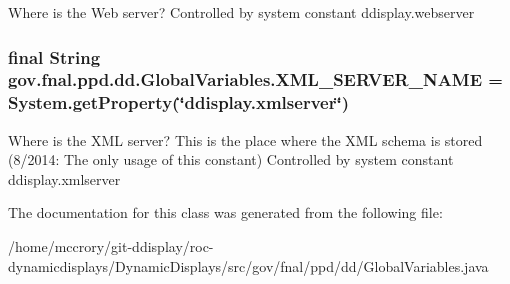 Where is the Web server? Controlled by system constant ddisplay.\-webserver \hypertarget{classgov_1_1fnal_1_1ppd_1_1dd_1_1GlobalVariables_a1b1eb1c9096380d09b968cd474e8bb86}{
\subsubsection[{X\-M\-L\-\_\-\-S\-E\-R\-V\-E\-R\-\_\-\-N\-A\-M\-E}]{\setlength{\rightskip}{0pt plus 5cm}final String gov.\-fnal.\-ppd.\-dd.\-Global\-Variables.\-X\-M\-L\-\_\-\-S\-E\-R\-V\-E\-R\-\_\-\-N\-A\-M\-E = System.\-get\-Property(\char`\"{}ddisplay.\-xmlserver\char`\"{})\hspace{0.3cm}{\ttfamily [static]}}}\label{classgov_1_1fnal_1_1ppd_1_1dd_1_1GlobalVariables_a1b1eb1c9096380d09b968cd474e8bb86}
Where is the X\-M\-L server? This is the place where the X\-M\-L schema is stored (8/2014\-: The only usage of this constant) Controlled by system constant ddisplay.\-xmlserver 

The documentation for this class was generated from the following file\-:\begin{DoxyCompactItemize}
\item 
/home/mccrory/git-\/ddisplay/roc-\/dynamicdisplays/\-Dynamic\-Displays/src/gov/fnal/ppd/dd/Global\-Variables.\-java\end{DoxyCompactItemize}

